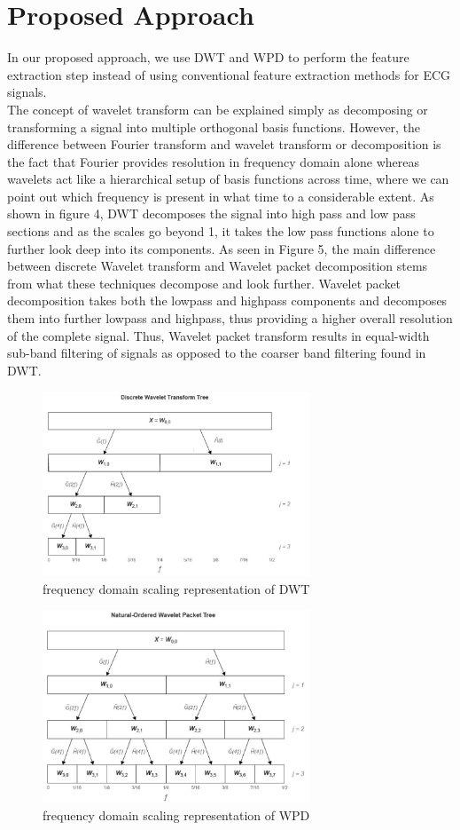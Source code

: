 \documentclass[10pt,twocolumn,letterpaper]{article}
\begin{document}
\section{Proposed Approach}

In our proposed approach, we use DWT and WPD to perform the feature extraction step instead of using conventional feature extraction methods for ECG signals.\\
The concept of wavelet transform can be explained simply as decomposing or transforming a signal into multiple orthogonal basis functions\cite{Alpher04}. However, the difference between Fourier transform and wavelet transform or decomposition is the fact that Fourier provides resolution in frequency domain alone whereas wavelets act like a hierarchical setup of basis functions across time, where we can point out which frequency is present in what time to a considerable extent. As shown in figure 4, DWT decomposes the signal into high pass and low pass sections and as the scales go beyond 1, it takes the low pass functions alone to further look deep into its components. As seen in Figure 5, the main difference between discrete Wavelet transform and Wavelet packet decomposition stems from what these techniques decompose and look further. Wavelet packet decomposition takes both the lowpass and highpass components and decomposes them into further lowpass and highpass, thus providing a higher overall resolution of the complete signal. Thus, Wavelet packet transform results in equal-width sub-band filtering of signals as opposed to the coarser band filtering found in DWT.
\begin{figure}[htbp]
\includegraphics[width=8cm]{dwt.JPG}
\caption{frequency domain scaling representation of DWT}
\label{DWT}
\end{figure}

\begin{figure}[htbp]
\includegraphics[width=8cm]{wpd.JPG}
\caption{frequency domain scaling representation of WPD}
\label{WPD}
\end{figure}
\end{document}
